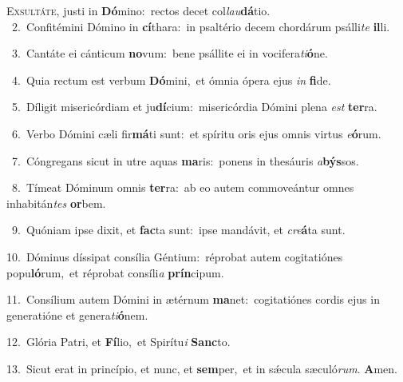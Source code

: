 \lettrine{\initial\textcolor{\initialcolor}{E}}{xsultáte,} justi in \textbf{Dó}\-mino:~\star rectos decet col\-\textit{lau}\-\textbf{dá}tio.\\
{\numbfont\textcolor{\numbcolor}{~2.}}~Confitémini Dómino in \textbf{cí}\-thara:~\star in psaltério decem chordárum psálli\textit{te} \textbf{il}\-li.\par
{\numbfont\textcolor{\numbcolor}{~3.}}~Cantáte ei cánticum \textbf{no}\-vum:~\star bene psállite ei in vocifera\-\textit{ti}\-\textbf{ó}ne.\par
{\numbfont\textcolor{\numbcolor}{~4.}}~Quia rectum est verbum \textbf{Dó}\-mini,~\star et ómnia ópera ejus \textit{in} \textbf{fi}\-de.\par
{\numbfont\textcolor{\numbcolor}{~5.}}~Díligit misericórdiam et ju\-\textbf{dí}\-cium:~\star misericórdia Dómini plena \textit{est} \textbf{ter}\-ra.\par
{\numbfont\textcolor{\numbcolor}{~6.}}~Verbo Dómini cæli fir\-\textbf{má}\-ti sunt:~\star et spíritu oris ejus omnis virtus \textit{e}\-\textbf{ó}rum.\par
{\numbfont\textcolor{\numbcolor}{~7.}}~Cóngregans sicut in utre aquas \textbf{ma}\-ris:~\star ponens in thesáuris \textit{a}\-\textbf{býs}sos.\par
{\numbfont\textcolor{\numbcolor}{~8.}}~Tímeat Dóminum omnis \textbf{ter}\-ra:~\star ab eo autem commoveántur omnes inhabitán\textit{tes} \textbf{or}\-bem.\par
{\numbfont\textcolor{\numbcolor}{~9.}}~Quóniam ipse dixit, et \textbf{fac}\-ta sunt:~\star ipse mandávit, et \textit{cre}\-\textbf{á}ta sunt.\par
{\numbfont\textcolor{\numbcolor}{10.}}~Dóminus díssipat consília Géntium:~\dagger réprobat autem cogitatiónes popu\-\textbf{ló}\-rum,~\star et réprobat consíli\textit{a} \textbf{prín}\-cipum.\par
{\numbfont\textcolor{\numbcolor}{11.}}~Consílium autem Dómini in ætérnum \textbf{ma}\-net:~\star cogitatiónes cordis ejus in generatióne et genera\-\textit{ti}\-\textbf{ó}nem.\par
{\numbfont\textcolor{\numbcolor}{12.}}~Glória Patri, et \textbf{Fí}\-lio,~\star et Spirítu\textit{i} \textbf{Sanc}\-to.\par
{\numbfont\textcolor{\numbcolor}{13.}}~Sicut erat in princípio, et nunc, et \textbf{sem}\-per,~\star et in sǽcula sæculó\-\textit{rum}\-. \textbf{A}\-men.\par
